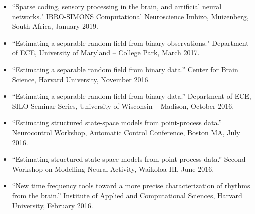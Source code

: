 \begin{itemize}
	\item ``Sparse coding, sensory processing in the brain, and artificial neural networks." IBRO-SIMONS Computational Neuroscience Imbizo, Muizenberg, South Africa, January 2019.
	\item ``Estimating a separable random field from binary observations." Department of ECE, University of Maryland -- College Park, March 2017.
    \item ``Estimating a separable random field from binary data.'' Center for Brain Science, Harvard University, November 2016.
    \item ``Estimating a separable random field from binary data.'' Department of ECE, SILO Seminar Series, University of Wisconsin -- Madison, October 2016.
   	\item ``Estimating structured state-space models from point-process data.'' Neurocontrol Workshop, Automatic Control Conference, Boston MA, July 2016.
    \item ``Estimating structured state-space models from point-process data.'' Second Workshop on Modelling Neural Activity, Waikoloa HI, June 2016.
    \item ``New time frequency tools toward a more precise characterization of rhythms from the brain.'' Institute of Applied and Computational Sciences, Harvard University, February 2016.

\end{itemize}
